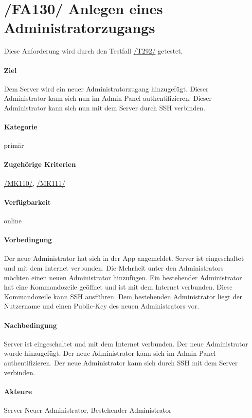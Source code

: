 \section[Anlegen eines Administratorzugangs]{/FA130/ Anlegen eines Administratorzugangs}
\label{/FA130/}
Diese Anforderung wird durch den Testfall \hyperref[/T292/]{/T292/} getestet.
\paragraph{Ziel}
Dem \Gls{Server} wird ein neuer \Gls{Administrator}zugang hinzugefügt.
Dieser Administrator kann sich nun im \Gls{Admin-Panel} authentifizieren.
Dieser Administrator kann sich nun mit dem \Gls{Server} durch \Gls{SSH} verbinden.
\paragraph{Kategorie}
primär
\paragraph{Zugehörige Kriterien}
\hyperref[/MK110/]{/MK110/}, \hyperref[/MK111/]{/MK111/}
\paragraph{Verfügbarkeit}
online
\paragraph{Vorbedingung}
Der neue \Gls{Administrator} hat sich in der App angemeldet.
\Gls{Server} ist eingeschaltet und mit dem Internet verbunden.
Die Mehrheit unter den \Glspl{Administrator} möchten einen neuen Administrator hinzufügen.
Ein bestehender \Gls{Administrator} hat eine \Gls{Kommandozeile} geöffnet und ist mit dem Internet verbunden.
Diese \Gls{Kommandozeile} kann \Gls{SSH} ausführen.
Dem bestehenden \Gls{Administrator} liegt der Nutzername und einen \Gls{Public-Key} des neuen Administrators vor.

\paragraph{Nachbedingung}
\Gls{Server} ist eingeschaltet und mit dem Internet verbunden.
Der neue \Gls{Administrator} wurde hinzugefügt.
Der neue \Gls{Administrator} kann sich im \Gls{Admin-Panel} authentifizieren.
Der neue \Gls{Administrator} kann sich durch \Gls{SSH} mit dem Server verbinden.

\paragraph{Akteure}
\Gls{Server}
Neuer \Gls{Administrator}, Bestehender \Gls{Administrator}

